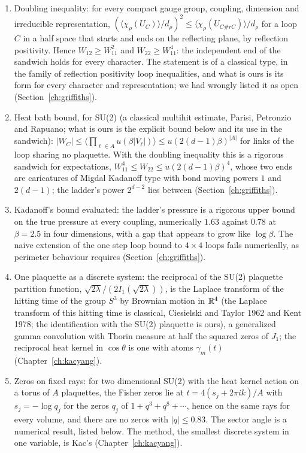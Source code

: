 \begin{enumerate}
\item Doubling inequality: for every compact gauge group, coupling, dimension and irreducible representation, $(\langle\chi_\rho(U_C)\rangle/d_\rho)^2\le\langle\chi_\rho(U_{C\#rC})\rangle/d_\rho$ for a loop $C$ in a half space that starts and ends on the reflecting plane, by reflection positivity. Hence $W_{12}\ge W_{11}^2$ and $W_{22}\ge W_{11}^4$: the independent end of the sandwich holds for every character. The statement is of a classical type, in the family of reflection positivity loop inequalities, and what is ours is its form for every character and representation; we had wrongly listed it as open (Section~\ref{ch:griffiths}).
\item Heat bath bound, for SU(2) (a classical multihit estimate, Parisi, Petronzio and Rapuano; what is ours is the explicit bound below and its use in the sandwich): $|W_C|\le\langle\prod_{\ell\in A}u(\beta|V_\ell|)\rangle\le u(2(d-1)\beta)^{|A|}$ for links of the loop sharing no plaquette. With the doubling inequality this is a rigorous sandwich for expectations, $W_{11}^4\le W_{22}\le u(2(d-1)\beta)^4$, whose two ends are caricatures of Migdal Kadanoff type with bond moving powers $1$ and $2(d-1)$; the ladder's power $2^{d-2}$ lies between (Section~\ref{ch:griffiths}).
\item Kadanoff's bound evaluated: the ladder's pressure is a rigorous upper bound on the true pressure at every coupling, numerically $1.63$ against $0.78$ at $\beta=2.5$ in four dimensions, with a gap that appears to grow like $\log\beta$. The naive extension of the one step loop bound to $4\times4$ loops fails numerically, as perimeter behaviour requires (Section~\ref{ch:griffiths}).
\item One plaquette as a discrete system: the reciprocal of the SU(2) plaquette partition function, $\sqrt{2\lambda}/(2I_1(\sqrt{2\lambda}))$, is the Laplace transform of the hitting time of the group $S^3$ by Brownian motion in $\mathbb{R}^4$ (the Laplace transform of this hitting time is classical, Ciesielski and Taylor 1962 and Kent 1978; the identification with the SU(2) plaquette is ours), a generalized gamma convolution with Thorin measure at half the squared zeros of $J_1$; the reciprocal heat kernel in $\cos\theta$ is one with atoms $\gamma_m(t)$ (Chapter~\ref{ch:kacyang}).
\item Zeros on fixed rays: for two dimensional SU(2) with the heat kernel action on a torus of $A$ plaquettes, the Fisher zeros lie at $t=4(s_j+2\pi ik)/A$ with $s_j=-\log q_j$ for the zeros $q_j$ of $1+q^3+q^8+\cdots$, hence on the same rays for every volume, and there are no zeros with $|q|\le0.83$. The sector angle is a numerical result, listed below. The method, the smallest discrete system in one variable, is Kac's (Chapter~\ref{ch:kacyang}).

\end{enumerate}
